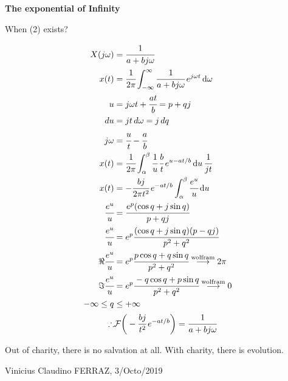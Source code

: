 \documentclass[12pt]{article}
\begin{document}
\Large

\begin{center}
\textbf{The exponential of Infinity}
\end{center}

\normalsize

When (2) exists?

\begin{align}
  X(j\omega) &= \cfrac{1}{a + bj\omega} \\
  x(t) &=\cfrac{1}{2\pi} \int_{-\infty}^{\infty} \cfrac{1}{a + bj\omega}\, e^{j\omega t} \,\mathrm{d}\omega \\
  u &= j\omega t + \cfrac{at}{b} = p + qj \\
  du &= jt\, d\omega = j\,dq \\
  j\omega &= \cfrac{u}{t} - \cfrac{a}{b} \\
  x(t) &= \cfrac{1}{2\pi} \int_{\alpha}^{\beta} \cfrac{1}{u}\,\cfrac{b}{t}\, e^{u - at/b} \,\mathrm{d}u\,\cfrac{1}{jt} \\
  x(t) &= -\cfrac{bj}{2\pi t^2}\, e^{-at/b} \int_{\alpha}^{\beta} \cfrac{e^u}{u} \,\mathrm{d}u \\
  \cfrac{e^u}{u} &= \cfrac{e^p (\cos q + j \sin q)}{p + qj} \\
  \cfrac{e^u}{u} &= e^p \cfrac{(\cos q + j \sin q)(p - qj)}{p^2 + q^2} \\
  \Re \cfrac{e^u}{u} &= e^p \cfrac{p \cos q + q \sin q}{p^2 + q^2} \stackrel{\text{wolfram}}{\longrightarrow} 2 \pi \\
  \Im \cfrac{e^u}{u} &= e^p \cfrac{-q \cos q + p \sin q}{p^2 + q^2} \stackrel{\text{wolfram}}{\longrightarrow} 0 \\
  -\infty \le q &\le +\infty \\
  \therefore &\mathcal{F}\bigg( -\cfrac{bj}{t^2}\, e^{-at/b} \bigg) = \cfrac{1}{a + bj\omega}
\end{align}

\vspace{3mm}

Out of charity, there is no salvation at all. With charity, there is evolution.

\vspace{3mm}

Vinicius Claudino FERRAZ, 3/Octo/2019
\end{document}
